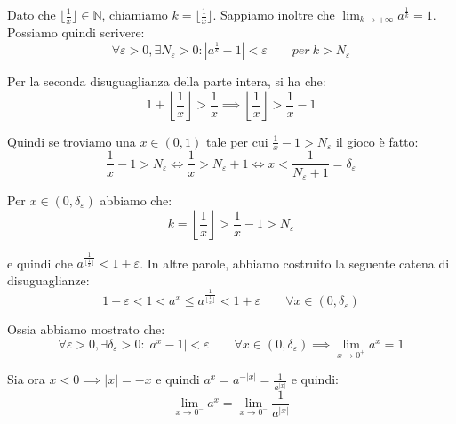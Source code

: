 \documentclass{article}
\begin{document}
\noindent Dato che $\lfloor \frac{1}{x} \rfloor \in \mathbb{N}$, chiamiamo $k = \lfloor \frac{1}{x} \rfloor$. Sappiamo inoltre che $\lim_{k \to +\infty} a^\frac{1}{k} = 1$. Possiamo quindi scrivere:
\begin{equation*}
    \forall \varepsilon > 0, \exists N_\varepsilon > 0 : |a^\frac{1}{k} - 1| < \varepsilon \qquad per \ k > N_\varepsilon
\end{equation*}

\noindent Per la seconda disuguaglianza della parte intera, si ha che:
\begin{equation*}
    1 + \left\lfloor \frac{1}{x} \right\rfloor > \frac{1}{x} \implies \left\lfloor \frac{1}{x} \right\rfloor > \frac{1}{x} - 1
\end{equation*}

\noindent Quindi se troviamo una $x \in (0, 1)$ tale per cui $\frac{1}{x} - 1 > N_\varepsilon$ il gioco è fatto:
\begin{equation*}
    \frac{1}{x} - 1 > N_\varepsilon \iff \frac{1}{x} > N_\varepsilon + 1 \iff x < \frac{1}{N_\varepsilon + 1} = \delta_\varepsilon
\end{equation*}

\noindent Per $x \in (0, \delta_\varepsilon)$ abbiamo che:
\begin{equation*}
    k = \left\lfloor \frac{1}{x} \right\rfloor > \frac{1}{x} - 1 > N_\varepsilon
\end{equation*}

\noindent e quindi che $a^\frac{1}{\lfloor\frac{1}{x}\rfloor} < 1 + \varepsilon$. In altre parole, abbiamo costruito la seguente catena di disuguaglianze:
\begin{equation*}
    1 - \varepsilon < 1 < a^x \leq a^\frac{1}{\lfloor \frac{1}{x} \rfloor} < 1 + \varepsilon \qquad \forall x \in (0, \delta_\varepsilon)
\end{equation*}

\noindent Ossia abbiamo mostrato che:
\begin{equation*}
    \forall \varepsilon > 0, \exists \delta_\varepsilon > 0 : |a^x - 1| < \varepsilon \qquad \forall x \in (0, \delta_\varepsilon) \implies \lim_{x \to 0^+} a^x = 1
\end{equation*}

\noindent Sia ora $x < 0 \implies |x| = -x$ e quindi $a^x = a^{-|x|} = \frac{1}{a^{|x|}}$ e quindi:
\begin{equation*}
    \lim_{x \to 0^-} a^x = \lim_{x \to 0^-} \frac{1}{a^{|x|}}
\end{equation*}
\end{document}
